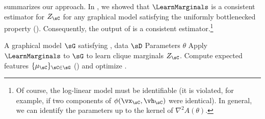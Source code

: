 %

 summarizes our approach.
In , we showed that $\LearnMarginals$ is a consistent
estimator for $Z_\sC$ for any graphical model satisfying the uniformly bottlenecked property (). 
Consequently, the output of 
is a consistent estimator.\footnote{Of course, the log-linear model must be identifiable
(it is violated, for example, if two components of $\phi(\vx_\sC, \vh_\sC)$ were identical).
In general, we can identify the parameters up to the kernel of $\nabla^2 A(\theta)$.}

\renewcommand{\algorithmicrequire}{\textbf{Input:}}
\renewcommand{\algorithmicensure}{\textbf{Output:}}
\begin{algorithm}
  \caption{\LearnLogLinear}
  \label{algo:undirected}
  \begin{algorithmic}
    \REQUIRE A graphical model $\sG$ satisfying , data $\sD$
    \ENSURE Parameters $\theta$
      \STATE Apply $\LearnMarginals$ to $\sG$ to learn clique marginals $Z_\sC$.
      \STATE Compute expected features $\{\mu_\sC\}_{\sC \in \sG}$ () and optimize .
  \end{algorithmic}
\end{algorithm}

